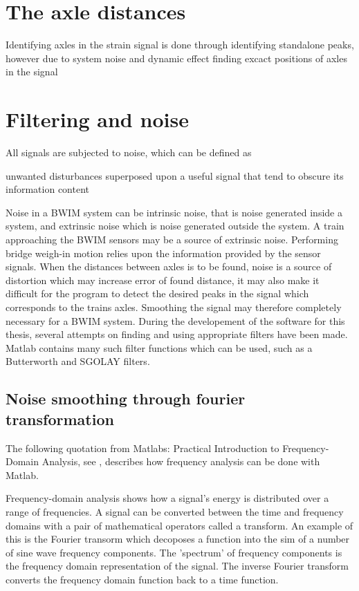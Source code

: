 \section{The axle distances}
Identifying axles in the strain signal is done through identifying standalone peaks, however due to system noise and dynamic effect finding excact positions of axles in the signal
\section{Filtering and noise}
All signals are subjected to noise, which can be defined as
\begin{displayquote}
	unwanted disturbances superposed upon a useful signal that tend to obscure its information content \cite{IEEE_electronics}
\end{displayquote}
Noise in a BWIM system can be intrinsic noise, that is noise generated inside a system, and extrinsic noise which is noise generated outside the system. A train approaching the BWIM sensors may be a source of extrinsic noise.
Performing bridge weigh-in motion relies upon the information provided by the sensor signals. When the distances between axles is to be found, noise is a source of distortion which may increase error of found distance, it may also make it difficult for the program to detect the desired peaks in the signal which corresponds to the trains axles. Smoothing the signal may therefore completely necessary for a BWIM system. During the developement of the software for this thesis, several attempts on finding and using appropriate filters have been made. Matlab contains many such filter functions which can be used, such as a Butterworth and SGOLAY filters.
\subsection{Noise smoothing through fourier transformation}
The following quotation from  Matlabs: Practical Introduction to Frequency-Domain Analysis, see \cite{frequency_domain_analysis}, describes how frequency analysis can be done with Matlab.
\begin{displayquote}
	Frequency-domain analysis shows how a signal's energy is distributed over a range of frequencies. A signal can be converted between the time and frequency domains with a pair of mathematical operators called a transform. An example of this is the Fourier transorm which decoposes a function into the sim of a number of sine wave frequency components. The 'spectrum' of frequency components is the frequency domain representation of the signal. The inverse Fourier transform converts the frequency domain function back to a time function.
\end{displayquote}

